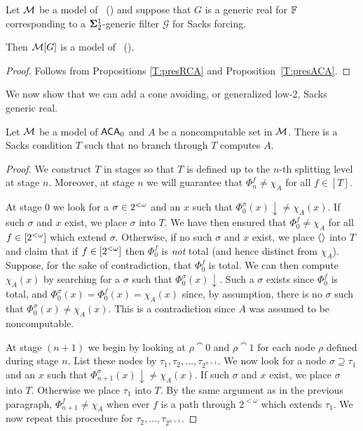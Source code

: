 \begin{thm}
Let $\mathcal{M}$ be a model of \RCAo\ (\ACAo)
and suppose that $G$ is a generic real for $\mathbb{F}$
corresponding to a $\mathbf{\Sigma}^1_2$-generic filter $\mathcal{G}$ for Sacks forcing.

Then $\mathcal{M}[G]$ is a model of \RCAo\ (\ACAo).
\end{thm}
\begin{proof}
Follows from Propositions \ref{T:presRCA} and Proposition~\ref{T:presACA}.
\end{proof}

We now show that we can add a cone avoiding, or generalized low-2,
Sacks generic real.

\begin{prop}\label{P:Sk:CAgeneric}
Let $\mathcal{M}$ be a model of $\mathsf{ACA}_0$ and $A$ be a noncomputable set in $\mathcal{M}$.
There is a Sacks condition $T$ such that no branch through $T$ computes $A$.
\end{prop}

\begin{proof}
We construct $T$ in stages so that $T$ is defined up
to the $n$-th splitting level at stage $n$.
Moreover, at stage $n$ we will guarantee
that $\Phi^f_n\neq\chi_A$ for all $f\in[T]$.

At stage 0 we look for a $\sigma\in2^{<\omega}$
and an $x$ such that $\Phi_0^{\sigma}(x)\downarrow\neq\chi_{A}(x)$.
If such $\sigma$ and $x$ exist, we place $\sigma$ into $T$.
We have then ensured that $\Phi_0^f\neq\chi_A$ for all
$f\in[2^{<\omega}]$ which extend $\sigma$.
Otherwise, if no such $\sigma$ and $x$ exist,
we place $\left\langle \right\rangle$ into $T$ and claim that
if $f\in [2^{<\omega}]$ then $\Phi_0^f$ is \textit{not} total
(and hence distinct from $\chi_A$).
Suppose, for the sake of contradiction, that $\Phi_0^f$ is total.
We can then compute $\chi_A(x)$ by searching for
a $\sigma$ such that $\Phi_0^\sigma(x)\downarrow$.
Such a $\sigma$ exists since $\Phi_0^f$ is total,
and $\Phi_0^\sigma(x)=\Phi_0^f(x)=\chi_A(x)$ since,
by assumption, there is no $\sigma$ such that
$\Phi_0^\sigma(x)\neq\chi_A(x)$.
This is a contradiction since $A$ was assumed to be noncomputable.

At stage $(n+1)$ we begin by looking at $\rho\cat0$ and $\rho\cat1$
for each node $\rho$ defined during stage $n$.
List these nodes by $\tau_1,\tau_2,\ldots,\tau_{2^{n+1}}$.
We now look for a node $\sigma\supseteq\tau_1$ and an $x$
such that $\Phi_{n+1}^\sigma(x)\downarrow\neq\chi_A(x)$.
If such $\sigma$ and $x$ exist, we place $\sigma$ into $T$.
Otherwise we place $\tau_1$ into $T$.
By the same argument as in the previous paragraph,
$\Phi_{n+1}^f\neq\chi_A$ when ever $f$ is a path
through $2^{<\omega}$ which extends $\tau_1$.
We now repeat this procedure for $\tau_2,\ldots,\tau_{2^{n+1}}$.
\end{proof}


